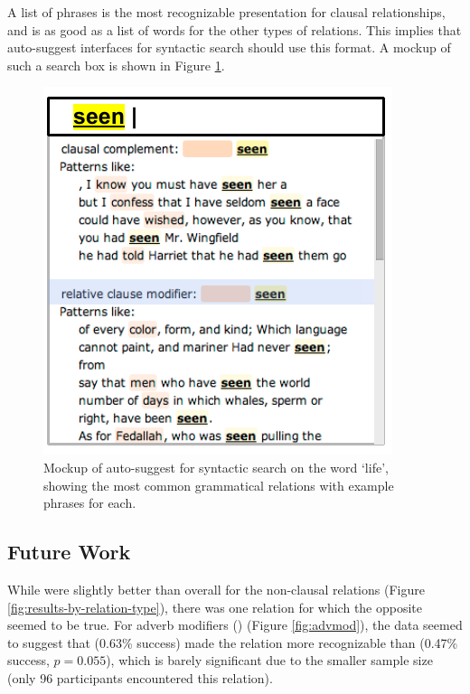 A list of phrases is the most recognizable presentation for clausal relationships, and is as good as a list of words for the other types of relations. This implies that auto-suggest interfaces for syntactic search should use this format. A mockup of such a search box is shown in Figure \ref{fig:phrases-mockup}.
\begin{figure}
\centering
\includegraphics[width=0.5\columnwidth]{fig/phrases-mockup}
\caption{
	\label{fig:phrases-mockup} Mockup of auto-suggest for syntactic search on the word `life', showing the most common grammatical relations with example phrases for each.
}
\end{figure}

\subsection{Future Work}
While  were slightly better than  overall for the non-clausal relations (Figure \ref{fig:results-by-relation-type}), there was one relation for which the opposite seemed to be true. For adverb modifiers () (Figure \ref{fig:advmod}), the data seemed to suggest that  (0.63\% success) made the relation more recognizable than  (0.47\% success, $p = 0.055$), which is barely significant due to the smaller sample size (only 96 participants encountered this relation).
